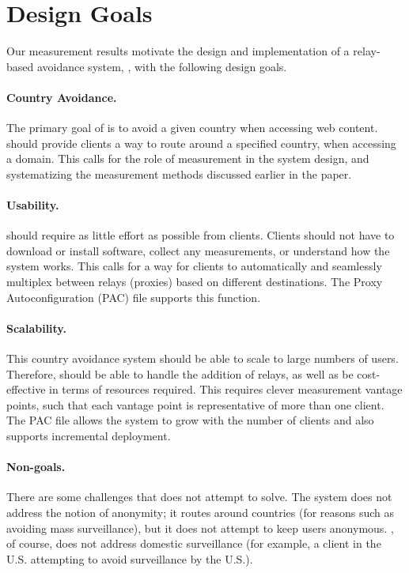 \section{Design Goals}
\label{goals}

Our measurement results motivate 
 the design and implementation of a relay-based avoidance system,
\system{}, with the following design goals.

\paragraph{Country Avoidance.}  The primary goal of \system{} is to
avoid a given country when accessing web content.  \system{} should
provide clients a way to route around a specified country, when
accessing a domain.  This calls for the role of measurement in the
system design, and systematizing the measurement methods discussed
earlier in the paper.

\paragraph{Usability.} \system{} should require as little effort as
possible from clients.  Clients should not have to download
or install software, collect any measurements, or understand how the
system works.  This calls for a way for clients to automatically and
seamlessly multiplex between relays (proxies) based on different
destinations.  The Proxy Autoconfiguration (PAC) file supports this
function.

\paragraph{Scalability.}  This country avoidance system should be able to scale to 
large numbers of users.  Therefore, \system{} should be able to handle the addition
 of relays, as well as be cost-effective in terms of resources required. This requires 
clever measurement vantage points, such that each vantage point is representative of 
more than one client.  The PAC file allows the system to 
grow with the number of clients and also supports incremental deployment.

\paragraph{Non-goals.}  There are some challenges that \system{} does not attempt to 
solve.  The system does not address the notion of anonymity; it routes around 
countries (for reasons such as avoiding mass surveillance), but it does not 
attempt to keep users anonymous.  
\system{}, of course, does not address domestic surveillance (for 
example, a client in the U.S. attempting to avoid surveillance by the 
U.S.).


